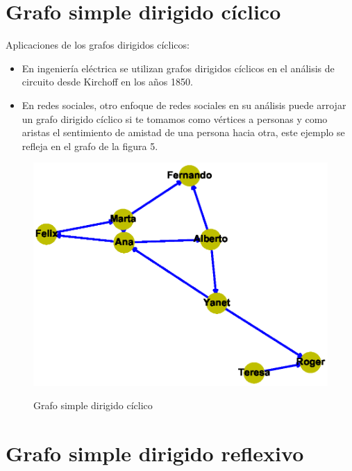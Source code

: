 \documentclass{article}
\begin{document}
\section{Grafo simple dirigido cíclico}
Aplicaciones de los grafos dirigidos cíclicos:
\begin{itemize}
\item En ingeniería eléctrica se utilizan grafos dirigidos cíclicos en el análisis de circuito desde Kirchoff en los años 1850.
\item En redes sociales, otro enfoque de redes sociales en su análisis puede arrojar un grafo dirigido cíclico si te tomamos como vértices a personas y como aristas el sentimiento de amistad de una persona hacia otra, este ejemplo se refleja en el grafo de la figura 5.


\end{itemize}
\begin{center}

\end{center}

\begin{figure}[h]
\begin{center}
\includegraphics[scale=0.7]{Graf5.eps}\\
\caption{Grafo simple dirigido cíclico}
\end{center}

\end{figure}
\section{Grafo simple dirigido reflexivo}
\end{document}
